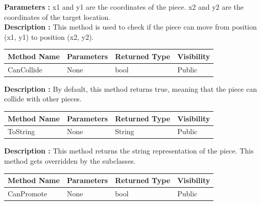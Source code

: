 \documentclass[12pt]{article}
\begin{document}
    \textbf{Parameters :} x1 and y1 are the coordinates of the piece.
    x2 and y2 are the coordinates of the target location.
    \\
    \textbf{Description :} This method is used to check if the piece can move from position (x1, y1) to position (x2, y2).

    \begin{table}[H]
        \begin{tabular}{|l|l|l|l|}
            \hline
            \rowcolor[HTML]{EFEFEF}
            \cellcolor[HTML]{EFEFEF}\textbf{Method Name} & \textbf{Parameters} & \textbf{Returned Type} & \textbf{Visibility} \\ \hline
            CanCollide                                   & None                & bool                   & Public              \\ \hline
        \end{tabular}
    \end{table}

    \textbf{Description :} By default, this method returns true, meaning that the piece can collide with other pieces.

    \begin{table}[H]
        \begin{tabular}{|l|l|l|l|}
            \hline
            \rowcolor[HTML]{EFEFEF}
            \cellcolor[HTML]{EFEFEF}\textbf{Method Name} & \textbf{Parameters} & \textbf{Returned Type} & \textbf{Visibility} \\ \hline
            ToString                                     & None                & String                 & Public              \\ \hline
        \end{tabular}
    \end{table}

    \textbf{Description :} This method returns the string representation of the piece.
    This method gets overridden by the subclasses.

    \begin{table}[H]
        \begin{tabular}{|l|l|l|l|}
            \hline
            \rowcolor[HTML]{EFEFEF}
            \cellcolor[HTML]{EFEFEF}\textbf{Method Name} & \textbf{Parameters} & \textbf{Returned Type} & \textbf{Visibility} \\ \hline
            CanPromote                                   & None                & bool                   & Public              \\ \hline
        \end{tabular}
    \end{table}
\end{document}
